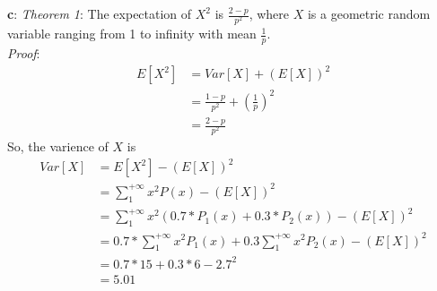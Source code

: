 \documentclass[12pt,letterpaper]{article}
\begin{document}
    \textbf{c}: \textit{Theorem 1}: The expectation of $X^{2}$ is $\frac{2 - p}{p^{2}}$, where $X$ is a geometric random variable ranging from 1 to infinity with mean $\frac{1}{p}$. \\
    \textit{Proof}:
        \begin{equation*}
            \begin{aligned}
                E[X^{2}] &= Var[X] + (E[X])^{2} \\
                &= \frac{1 - p}{p^{2}} + (\frac{1}{p})^{2} \\
                &= \frac{2 - p}{p^{2}}
            \end{aligned}
        \end{equation*}
    So, the varience of $X$ is
        \begin{equation*}
            \begin{aligned}
                Var[X] &= E[X^{2}] - (E[X])^{2} \\
                &= \sum_{1}^{+\infty} x^{2}P(x) - (E[X])^{2} \\
                &= \sum_{1}^{+\infty} x^{2}(0.7 * P_{1}(x) + 0.3 * P_{2}(x)) - (E[X])^{2} \\
                &= 0.7 * \sum_{1}^{+\infty} x^{2}P_{1}(x) + 0.3 \sum_{1}^{+\infty} x^{2}P_{2}(x) - (E[X])^{2} \\
                &= 0.7 * 15 + 0.3 * 6 - 2.7^{2} \\
                &= 5.01 \\
            \end{aligned}
        \end{equation*}
\end{document}
